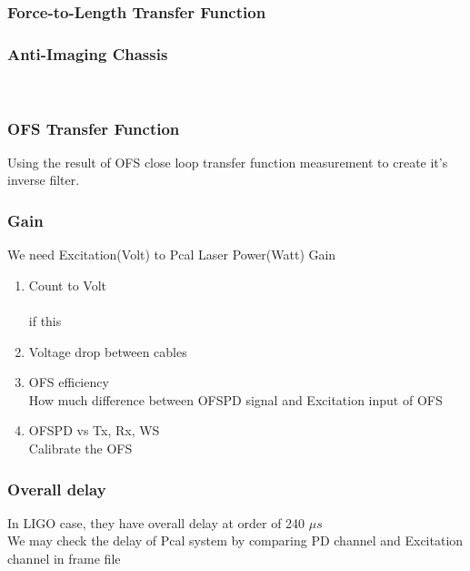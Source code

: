     \subsubsection{Force-to-Length Transfer Function}
    \subsubsection{Anti-Imaging Chassis}
     \\
    
    \subsubsection{OFS Transfer Function}
    Using the result of OFS close loop transfer function measurement to create it's inverse filter. 
    \subsubsection{Gain}
    We need Excitation(Volt) to Pcal Laser Power(Watt) Gain
    \begin{enumerate}
        \item Count to Volt \\
            \\
            if this 
        \item Voltage drop between cables \\
        \item OFS efficiency \\
            How much difference between OFSPD signal and Excitation input of OFS
        \item OFSPD vs Tx, Rx, WS \\
	    Calibrate the OFS
    \end{enumerate}
    
    \subsubsection{Overall delay}
In LIGO case, they have overall delay at order of 240 $\mu s$ \cite{ligo:inj}\\
We may check the delay of Pcal system by comparing PD channel and Excitation channel in frame file



